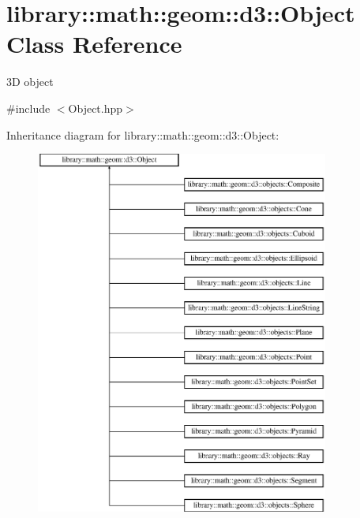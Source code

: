 \hypertarget{classlibrary_1_1math_1_1geom_1_1d3_1_1_object}{}\section{library\+:\+:math\+:\+:geom\+:\+:d3\+:\+:Object Class Reference}
\label{classlibrary_1_1math_1_1geom_1_1d3_1_1_object}


3D object  




{\ttfamily \#include $<$Object.\+hpp$>$}

Inheritance diagram for library\+:\+:math\+:\+:geom\+:\+:d3\+:\+:Object\+:\begin{figure}[H]
\begin{center}
\leavevmode
\includegraphics[height=12.000000cm]{classlibrary_1_1math_1_1geom_1_1d3_1_1_object}
\end{center}
\end{figure}
